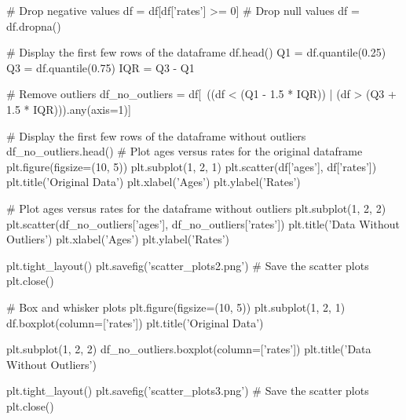 \documentclass{beamer}
\begin{document}
\begin{pycode}
	
	# Drop negative values
df = df[df['rates'] >= 0]
# Drop null values
df = df.dropna()

# Display the first few rows of the dataframe
df.head()
Q1 = df.quantile(0.25)
Q3 = df.quantile(0.75)
IQR = Q3 - Q1

# Remove outliers
df_no_outliers = df[~((df < (Q1 - 1.5 * IQR)) | (df > (Q3 + 1.5 * IQR))).any(axis=1)]

# Display the first few rows of the dataframe without outliers
df_no_outliers.head()
# Plot ages versus rates for the original dataframe
plt.figure(figsize=(10, 5))
plt.subplot(1, 2, 1)
plt.scatter(df['ages'], df['rates'])
plt.title('Original Data')
plt.xlabel('Ages')
plt.ylabel('Rates')

# Plot ages versus rates for the dataframe without outliers
plt.subplot(1, 2, 2)
plt.scatter(df_no_outliers['ages'], df_no_outliers['rates'])
plt.title('Data Without Outliers')
plt.xlabel('Ages')
plt.ylabel('Rates')

plt.tight_layout()
plt.savefig('scatter_plots2.png')  # Save the scatter plots
plt.close()

# Box and whisker plots
plt.figure(figsize=(10, 5))
plt.subplot(1, 2, 1)
df.boxplot(column=['rates'])
plt.title('Original Data')

plt.subplot(1, 2, 2)
df_no_outliers.boxplot(column=['rates'])
plt.title('Data Without Outliers')

plt.tight_layout()
plt.savefig('scatter_plots3.png')  # Save the scatter plots
plt.close()

	
\end{pycode}
\end{document}
